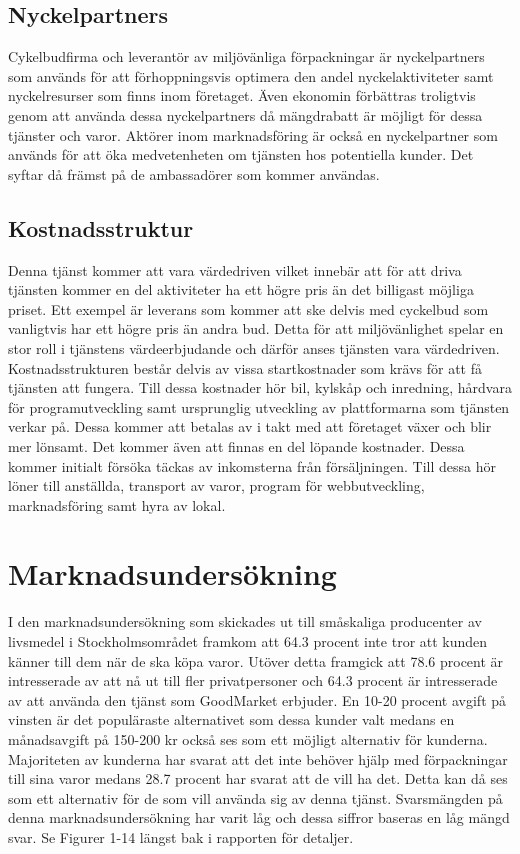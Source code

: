 \documentclass[10pt,a4paper,oneside]{article}
\begin{document}
\subsection{Nyckelpartners}
Cykelbudfirma och leverantör av miljövänliga förpackningar är nyckelpartners som används för att förhoppningsvis optimera den andel nyckelaktiviteter samt nyckelresurser som finns inom företaget. Även ekonomin förbättras troligtvis genom att använda dessa nyckelpartners då mängdrabatt är möjligt för dessa tjänster och varor. Aktörer inom marknadsföring är också en nyckelpartner som används för att öka medvetenheten om tjänsten hos potentiella kunder. Det syftar då främst på de ambassadörer som kommer användas. 

\subsection{Kostnadsstruktur}
Denna tjänst kommer att vara värdedriven vilket innebär att för att driva tjänsten kommer en del aktiviteter ha ett högre pris än det billigast möjliga priset. Ett exempel är leverans som kommer att ske delvis med cyckelbud som vanligtvis har ett högre pris än andra bud. Detta för att miljövänlighet spelar en stor roll i tjänstens värdeerbjudande och därför anses tjänsten vara värdedriven.\\ 

Kostnadsstrukturen består delvis av vissa startkostnader som krävs för att få tjänsten att fungera. Till dessa kostnader hör bil, kylskåp och inredning, hårdvara för programutveckling samt ursprunglig utveckling av plattformarna som tjänsten verkar på. Dessa kommer att betalas av i takt med att företaget växer och blir mer lönsamt. Det kommer även att finnas en del löpande kostnader. Dessa kommer initialt försöka täckas av inkomsterna från försäljningen. Till dessa hör löner till anställda, transport av varor, program för webbutveckling, marknadsföring samt hyra av lokal.  


\newpage

\section{Marknadsundersökning}
I den marknadsundersökning som skickades ut till småskaliga producenter av livsmedel i Stockholmsområdet framkom att 64.3 procent inte tror att kunden känner till dem när de ska köpa varor. Utöver detta framgick att 78.6 procent är intresserade av att nå ut till fler privatpersoner och 64.3 procent är intresserade av att använda den tjänst som GoodMarket erbjuder. En 10-20 procent avgift på vinsten är det populäraste alternativet som dessa kunder valt medans en månadsavgift på 150-200 kr också ses som ett möjligt alternativ för kunderna. Majoriteten av kunderna har svarat att det inte behöver hjälp med förpackningar till sina varor medans 28.7 procent har svarat att de vill ha det. Detta kan då ses som ett alternativ för de som vill använda sig av denna tjänst. Svarsmängden på denna marknadsundersökning har varit låg och dessa siffror baseras en låg mängd svar. Se Figurer 1-14 längst bak i rapporten för detaljer. 
\end{document}
